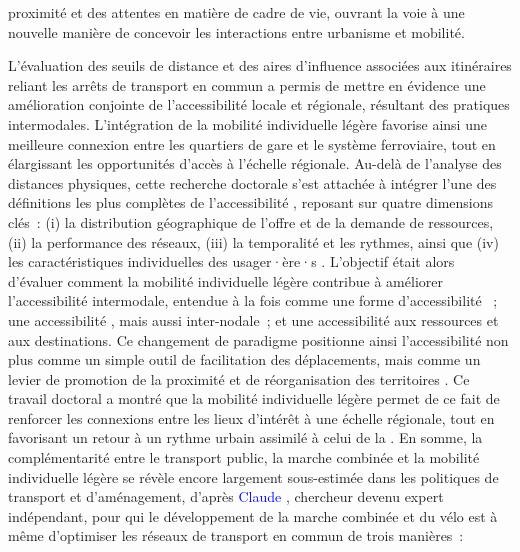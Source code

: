 \begin{refsegment}
proximité et des attentes en matière de cadre de vie, ouvrant la voie à une nouvelle manière de concevoir les interactions entre urbanisme et mobilité.%

L’évaluation des seuils de distance et des aires d’influence associées aux itinéraires reliant les arrêts de transport en commun a permis de mettre en évidence une amélioration conjointe de l’accessibilité locale et régionale, résultant des pratiques intermodales. L’intégration de la mobilité individuelle légère favorise ainsi une meilleure connexion entre les quartiers de gare et le système ferroviaire, tout en élargissant les opportunités d’accès à l’échelle régionale. Au-delà de l’analyse des distances physiques, cette recherche doctorale s'est attachée à intégrer l'une des définitions les plus complètes de l'accessibilité \textcolor{blue}{\autocite[3]{chapelon_accessibilite_2006}}, reposant sur quatre dimensions clés~: (i) la distribution géographique de l'offre et de la demande de ressources, (ii) la performance des réseaux, (iii) la temporalité et les rythmes, ainsi que (iv) les caractéristiques individuelles des usager·ère·s \textcolor{blue}{\autocite[128]{geurs_accessibility_2004}}. L’objectif était alors d’évaluer comment la mobilité individuelle légère contribue à améliorer l'accessibilité intermodale, entendue à la fois comme une forme d'accessibilité  \textcolor{blue}{\autocite[2]{silva_proximity-centred_2023}}~; une accessibilité  \textcolor{blue}{\autocite[283-343]{chapelon_offre_1997}}, mais aussi inter-nodale~; et une accessibilité aux ressources et aux destinations. Ce changement de paradigme positionne ainsi l’accessibilité non plus comme un simple outil de facilitation des déplacements, mais comme un levier de promotion de la proximité et de réorganisation des territoires \textcolor{blue}{\autocite[4]{levine_century_2020}}. Ce travail doctoral a montré que la mobilité individuelle légère permet de ce fait de renforcer les connexions entre les lieux d'intérêt à une échelle régionale, tout en favorisant un retour à un rythme urbain assimilé à celui de la  \textcolor{blue}{\autocite[9]{silva_proximity-centred_2023}}. En somme, la complémentarité entre le transport public, la marche combinée et la mobilité individuelle légère se révèle encore largement sous-estimée dans les politiques de transport et d’aménagement, d'après \textcolor{blue}{Claude} \textcolor{blue}{\textcite[6-7]{soulas_triptyque_2021}}, chercheur devenu expert indépendant, pour qui le développement de la marche combinée et du vélo est à même d'optimiser les réseaux de transport en commun de trois manières~:

\end{refsegment}

